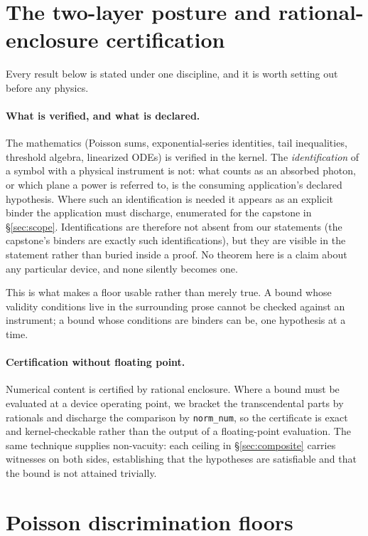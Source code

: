 \documentclass[aps,prx,reprint,nofootinbib,superscriptaddress]{revtex4-2}
\begin{document}
\section{The two-layer posture and rational-enclosure certification}
\label{sec:posture}

Every result below is stated under one discipline, and it is worth setting out before any physics.

\paragraph{What is verified, and what is declared.} The mathematics (Poisson sums, exponential-series identities, tail inequalities, threshold algebra, linearized ODEs) is verified
in the kernel. The \emph{identification} of a symbol with a physical instrument is not: what counts
as an absorbed photon, or which plane a power is referred to, is the consuming application's
declared hypothesis. Where such an identification is needed it appears as an explicit binder the
application must discharge, enumerated for the capstone in \S\ref{sec:scope}. Identifications are
therefore not absent from our statements (the capstone's binders are exactly such identifications), but they are visible in the statement rather than buried inside a proof. No
theorem here is a claim about any particular device, and none silently becomes one.

This is what makes a floor usable rather than merely true. A bound whose validity conditions live in
the surrounding prose cannot be checked against an instrument; a bound whose conditions are binders
can be, one hypothesis at a time.

\paragraph{Certification without floating point.} Numerical content is certified by rational
enclosure. Where a bound must be evaluated at a device operating point, we bracket the transcendental
parts by rationals and discharge the comparison by \texttt{norm\_num}, so the certificate is exact
and kernel-checkable rather than the output of a floating-point evaluation. The same technique
supplies non-vacuity: each ceiling in \S\ref{sec:composite} carries witnesses on both sides,
establishing that the hypotheses are satisfiable and that the bound is not attained trivially.

\section{Poisson discrimination floors}
\label{sec:poisson}
\end{document}
